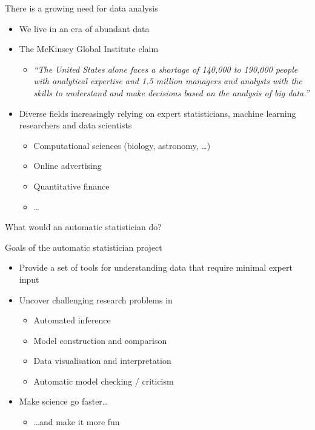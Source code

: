 \begin{frame}{There is a growing need for data analysis}
  \begin{itemize}
    \item We live in an era of abundant data
    \vspace{\baselineskip}
    \item The McKinsey Global Institute claim
    \begin{itemize}
      \item \emph{``The United States alone faces a shortage of 140,000 to 190,000 people with analytical expertise and 1.5 million managers and analysts with the skills to understand and make decisions based on the analysis of big data.''}
    \end{itemize}
    \vspace{\baselineskip}
    \item Diverse fields increasingly relying on expert statisticians, machine learning researchers and data scientists \eg
    \begin{itemize}
       \item Computational sciences (\eg biology, astronomy, \ldots)
       \item Online advertising
       \item Quantitative finance
       \item \ldots
     \end{itemize}
  \end{itemize}
\end{frame}

\begin{frame}{What would an automatic statistician do?}
  
\end{frame}

\begin{frame}{Goals of the automatic statistician project}
  \begin{itemize}
    \item Provide a set of tools for understanding data that require minimal expert input
    \vspace{\baselineskip}
    \item Uncover challenging research problems in \eg
    \begin{itemize}
      \item Automated inference
      \item Model construction and comparison
      \item Data visualisation and interpretation
      \item Automatic model checking / criticism
    \end{itemize}
    \vspace{\baselineskip}
    \item Make science go faster\dots
    \begin{itemize}
      \item \dots and make it more fun
    \end{itemize}
  \end{itemize}
\end{frame}

